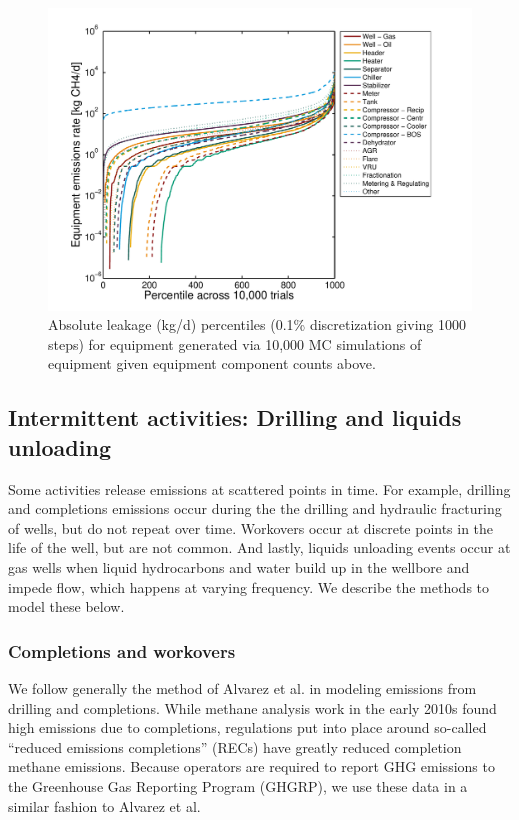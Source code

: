\documentclass[11pt]{report}
\begin{document}
{{{{\begin{figure}[]
\includegraphics[width=1\columnwidth]{images/VF_Component_PercentilesEquip.pdf}
\caption{Absolute leakage (kg/d) percentiles (0.1\% discretization giving 1000 steps)  for equipment generated via 10,000 MC simulations of equipment given equipment component counts above.}
\label{fig:Equipment_Percentiles}
\end{figure}



\clearpage

\subsection{Intermittent activities: Drilling and liquids unloading}

Some activities release emissions at scattered points  in time. For example, drilling and completions emissions occur during the the drilling and hydraulic fracturing of wells, but do not repeat over time. Workovers occur at discrete points in the life of the well, but are not common.  And lastly, liquids unloading events occur at gas wells when liquid hydrocarbons and water build up in the wellbore and impede flow, which happens at varying frequency. We describe the methods to model these below.

\subsubsection{Completions and workovers}

We follow generally the method of Alvarez et al. \cite{Alvarez2018} in modeling emissions from drilling and completions. While methane analysis work in the early 2010s found high emissions due to completions, regulations put into place around so-called ``reduced emissions completions'' (RECs) have greatly reduced completion methane emissions. Because operators are required to report GHG emissions to the Greenhouse Gas Reporting Program (GHGRP), we use these data in a similar fashion to Alvarez et al.

}}}}
\end{document}
